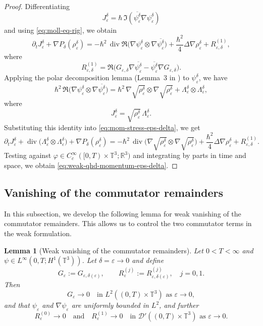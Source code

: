 \documentclass[11pt]{article}
\newtheorem{lemma}{Lemma}
\begin{document}
\begin{proof}
Differentiating
\[
J^\delta_\varepsilon=\hbar\,\Im(\overline{\psi^\delta_\varepsilon}\nabla\psi^\delta_\varepsilon)
\]
and using \eqref{eq:moll-eq-rig}, we obtain
\[
\partial_t J^\delta_\varepsilon + \nabla P_\delta(\rho^\delta_\varepsilon)
=
-\hbar^2\,\operatorname{div}\Re\!\bigl(\nabla\psi^\delta_\varepsilon\otimes\nabla\overline{\psi^\delta_\varepsilon}\bigr)
+\frac{\hbar^2}{4}\Delta\nabla\rho^\delta_\varepsilon
+R^{(1)}_{\varepsilon,\delta},
\]
where
\[
R^{(1)}_{\varepsilon,\delta}
=
\Re\!\bigl(G_{\varepsilon,\delta}\nabla\overline{\psi^\delta_\varepsilon}
-
\overline{\psi^\delta_\varepsilon}\nabla G_{\varepsilon,\delta}\bigr).
\]
Applying the polar decomposition lemma (Lemma~3 in \cite{AntonelliMarcati2009}) to $\psi^\delta_\varepsilon$, we have
\[
\hbar^2\,\Re\!\bigl(\nabla\psi^\delta_\varepsilon\otimes\nabla\overline{\psi^\delta_\varepsilon}\bigr)
=
\hbar^2\,\nabla\sqrt{\rho^\delta_\varepsilon}\otimes\nabla\sqrt{\rho^\delta_\varepsilon}
+
\Lambda^\delta_\varepsilon\otimes\Lambda^\delta_\varepsilon,
\]
where
\[
J^\delta_\varepsilon=\sqrt{\rho^\delta_\varepsilon}\,\Lambda^\delta_\varepsilon.
\]
Substituting this identity into \eqref{eq:mom-stress-eps-delta}, we get
\[
\partial_t J^\delta_\varepsilon
+\operatorname{div}\bigl(\Lambda^\delta_\varepsilon\otimes\Lambda^\delta_\varepsilon\bigr)
+\nabla P_\delta(\rho^\delta_\varepsilon)
=
-\hbar^2\,\operatorname{div}\!\bigl(\nabla\sqrt{\rho^\delta_\varepsilon}\otimes\nabla\sqrt{\rho^\delta_\varepsilon}\bigr)
+\frac{\hbar^2}{4}\Delta\nabla\rho^\delta_\varepsilon
+R^{(1)}_{\varepsilon,\delta}.
\]
Testing against $\varphi\in C_c^\infty([0,T)\times\mathbb{T}^3;\mathbb{R}^3)$ and integrating by parts in time and space, we obtain \eqref{eq:weak-qhd-momentum-eps-delta}.
\end{proof}




\subsection{Vanishing of the commutator remainders}
In this subsection, we develop the following lemma for weak vanishing of the commutator remainders. This allows us to control the two commutator terms in the weak formulation. 

\begin{lemma}[Weak vanishing of the commutator remainders]
\label{Lemma commutator}
Let $0<T<\infty$ and $\psi\in L^\infty(0,T;H^1(\mathbb{T}^3))$.  
Let $\delta=\varepsilon\to 0$  and define
\[
G_\varepsilon := G_{\varepsilon,\delta(\varepsilon)},\qquad
R^{(j)}_\varepsilon := R^{(j)}_{\varepsilon,\delta(\varepsilon)},\quad j=0,1.
\]
Then
\begin{equation}\label{eq:G-assumptions-log}
G_\varepsilon \to 0 \quad \text{in } L^2((0,T)\times\mathbb{T}^3) \text{ as } \varepsilon \to 0,
\end{equation}
and that $\psi_\varepsilon$ and $\nabla\psi_\varepsilon$ are uniformly  bounded in $L^2$,
 and further 
\[
R^{(0)}_\varepsilon \to 0 \quad \text{and} \quad R^{(1)}_\varepsilon \to 0 \quad \text{in } \mathcal D'((0,T)\times\mathbb{T}^3) \text{ as } \varepsilon \to 0.
\]
\end{lemma}
\end{document}

